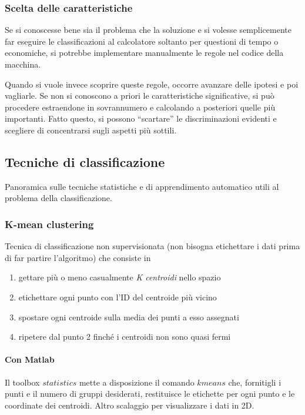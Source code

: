 \subsubsection{Scelta delle caratteristiche}
\label{sssez:scelta}

Se si conoscesse bene sia il problema che la soluzione e
si volesse semplicemente far eseguire le classificazioni
al calcolatore soltanto per questioni di tempo o economiche,
si potrebbe implementare manualmente le regole nel codice della macchina.

Quando si vuole invece scoprire queste regole,
occorre avanzare delle ipotesi e poi vagliarle.
Se non si conoscono a priori le caratteristiche significative,
si può procedere estraendone in sovrannumero e
calcolando a posteriori quelle più importanti.
Fatto questo, si possono ``scartare'' le discriminazioni evidenti
e scegliere di concentrarsi sugli aspetti più sottili.







\subsection{Tecniche di classificazione}
Panoramica sulle tecniche statistiche e di apprendimento automatico utili al problema della classificazione.

\subsubsection{K-mean clustering}
Tecnica di classificazione non supervisionata
(non bisogna etichettare i dati prima di far partire l'algoritmo)
che consiste in
\begin{enumerate}
  \item{gettare pi\`u o meno casualmente \emph{K centroidi} nello spazio}
  \item{etichettare ogni punto con l'ID del centroide pi\`u vicino}
  \item{spostare ogni centroide sulla media dei punti a esso assegnati}
  \item{ripetere dal punto 2 finch\'e i centroidi non sono quasi fermi}
\end{enumerate}

\paragraph{Con Matlab}
Il toolbox $statistics$ mette a disposizione il comando $kmeans$ che,
fornitigli i punti e il numero di gruppi desiderati,
restituisce le etichette per ogni punto e le coordinate dei centroidi.
Altro scalaggio per visualizzare i dati in 2D.

